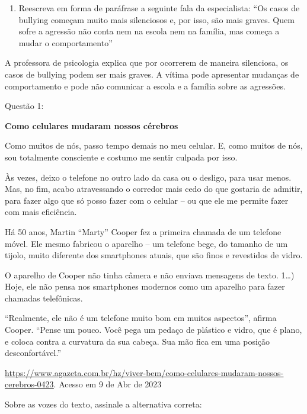 {\begin{enumerate}
\def\labelenumi{\arabic{enumi})}
\setcounter{enumi}{9}
\tightlist
\item
  Reescreva em forma de paráfrase a seguinte fala da especialista: ``Os
  casos de bullying começam muito mais silenciosos e, por isso, são mais
  graves. Quem sofre a agressão não conta nem na escola nem na família,
  mas começa a mudar o comportamento''
\end{enumerate}

A professora de psicologia explica que por ocorrerem de maneira
silenciosa, os casos de bullying podem ser mais graves. A vítima pode
apresentar mudanças de comportamento e pode não comunicar a escola e a
família sobre as agressões.


Questão 1:

\textbf{Como celulares mudaram nossos cérebros}

Como muitos de nós, passo tempo demais no meu celular. E, como muitos de
nós, sou totalmente consciente e costumo me sentir culpada por isso.

Às vezes, deixo o telefone no outro lado da casa ou o desligo, para usar
menos. Mas, no fim, acabo atravessando o corredor mais cedo do que
gostaria de admitir, para fazer algo que só posso fazer com o celular --
ou que ele me permite fazer com mais eficiência.

Há 50 anos, Martin ``Marty'' Cooper fez a primeira chamada de um
telefone móvel. Ele mesmo fabricou o aparelho -- um telefone bege, do
tamanho de um tijolo, muito diferente dos smartphones atuais, que são
finos e revestidos de vidro.

O aparelho de Cooper não tinha câmera e não enviava mensagens de texto.
1\ldots) Hoje, ele não pensa nos smartphones modernos como um aparelho
para fazer chamadas telefônicas.

``Realmente, ele não é um telefone muito bom em muitos aspectos'',
afirma Cooper. ``Pense um pouco. Você pega um pedaço de plástico e
vidro, que é plano, e coloca contra a curvatura da sua cabeça. Sua mão
fica em uma posição desconfortável.''

\href{https://www.agazeta.com.br/hz/viver-bem/como-celulares-mudaram-nossos-cerebros-0423}{\uline{https://www.agazeta.com.br/hz/viver-bem/como-celulares-mudaram-nossos-cerebros-0423}}.
Acesso em 9 de Abr de 2023

Sobre as vozes do texto, assinale a alternativa correta:

}
